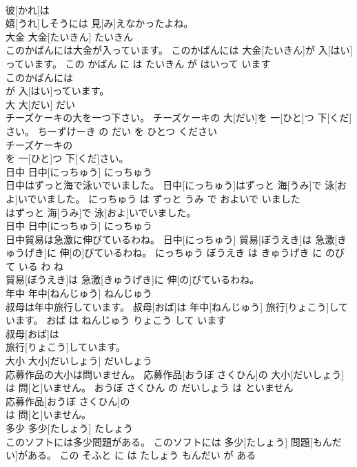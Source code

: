 \documentclass[8pt]{extreport}
\begin{document}
\begin{CJK}{UTF8}{min}
\\	彼[かれ]は
\\	嬉[うれ]しそうには 見[み]えなかったよね。			
\\	大金	大金[たいきん]	たいきん	
\\	このかばんには大金が入っています。	このかばんには 大金[たいきん]が 入[はい]っています。	この かばん に は たいきん が はいって います	
\\	このかばんには
\\	が 入[はい]っています。			
\\	大	大[だい]	だい	
\\	チーズケーキの大を一つ下さい。	チーズケーキの 大[だい]を 一[ひと]つ 下[くだ]さい。	ちーずけーき の だい を ひとつ ください	
\\	チーズケーキの
\\	を 一[ひと]つ 下[くだ]さい。			
\\	日中	日中[にっちゅう]	にっちゅう	
\\	日中はずっと海で泳いでいました。	日中[にっちゅう]はずっと 海[うみ]で 泳[およ]いでいました。	にっちゅう は ずっと うみ で およいで いました	
\\	はずっと 海[うみ]で 泳[およ]いでいました。			
\\	日中	日中[にっちゅう]	にっちゅう	
\\	日中貿易は急激に伸びているわね。	日中[にっちゅう] 貿易[ぼうえき]は 急激[きゅうげき]に 伸[の]びているわね。	にっちゅう ぼうえき は きゅうげき に のびて いる わ ね	
\\	貿易[ぼうえき]は 急激[きゅうげき]に 伸[の]びているわね。			
\\	年中	年中[ねんじゅう]	ねんじゅう	
\\	叔母は年中旅行しています。	叔母[おば]は 年中[ねんじゅう] 旅行[りょこう]しています。	おば は ねんじゅう りょこう して います	
\\	叔母[おば]は
\\	旅行[りょこう]しています。			
\\	大小	大小[だいしょう]	だいしょう	
\\	応募作品の大小は問いません。	応募作品[おうぼ さくひん]の 大小[だいしょう]は 問[と]いません。	おうぼ さくひん の だいしょう は といません	
\\	応募作品[おうぼ さくひん]の
\\	は 問[と]いません。			
\\	多少	多少[たしょう]	たしょう	
\\	このソフトには多少問題がある。	このソフトには 多少[たしょう] 問題[もんだい]がある。	この そふと に は たしょう もんだい が ある	

\end{CJK}
\end{document}
